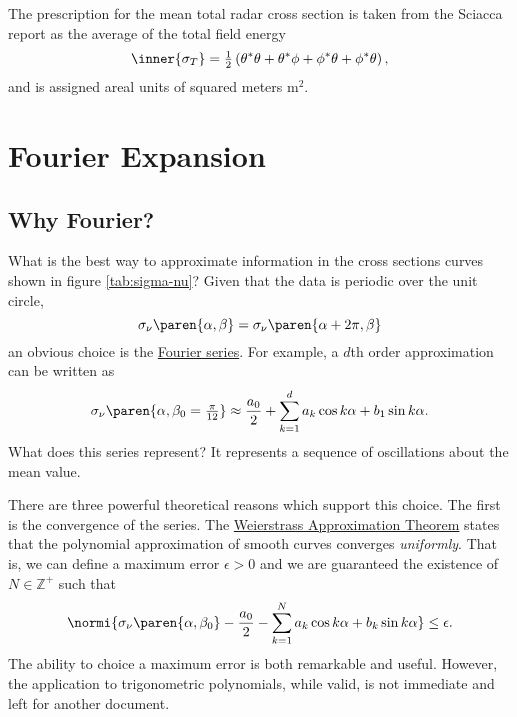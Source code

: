 The prescription for the mean total radar cross section is taken from the Sciacca report as the average of the total field energy
\begin{equation}
	\inner{ \sigma_{T} } = \tfrac{1}{2} \left( \theta^{*}\theta + \theta^{*}\phi + \phi^{*}\theta + \phi^{*}\theta \right),
\end{equation}
and is assigned areal units of squared meters m$^{2}$.
\section{Fourier Expansion}

\subsection{Why Fourier?}
What is the best way to approximate information in the cross sections curves shown in figure \ref{tab:sigma-nu}? Given that the data is periodic over the unit circle, 
\begin{equation}
	\sigma_{\nu} \paren{\alpha, \beta} = \sigma_{\nu} \paren{\alpha+2\pi, \beta}
\end{equation}
an obvious choice is the \href{https://mathworld.wolfram.com/FourierSeries.html}{Fourier series}. For example, a $d$th order approximation can be written as
\begin{equation}
	\sigma_{\nu}\paren{\alpha,\beta_{0}=\tfrac{\pi}{12}}  \approx \dfrac{a_{0}}{2} + \sum_{k=1}^{d}a_{k}\cos k\alpha + b_{1}\sin k\alpha.
\end{equation}
What does this series represent? It represents a sequence of oscillations about the mean value.

There are three powerful theoretical reasons which support this choice. The first is the convergence of the series. The \href{Weierstrass Approximation Theorem}{Weierstrass Approximation Theorem} states that the polynomial approximation of smooth curves converges {\it{uniformly}}. That is, we can define a maximum error $\epsilon > 0$ and we are guaranteed the existence of $N \in \mathbb{Z}^{+}$ such that
\begin{equation}
	\normi{\sigma_{\nu}\paren{\alpha, \beta_{0}} -  \dfrac{a_{0}}{2} - \sum_{k=1}^{N}a_{k}\cos k\alpha + b_{k}\sin k\alpha} \le \epsilon.
\end{equation}
The ability to choice a maximum error is both remarkable and useful. However, the application to trigonometric polynomials, while valid, is not immediate and left for another document.

